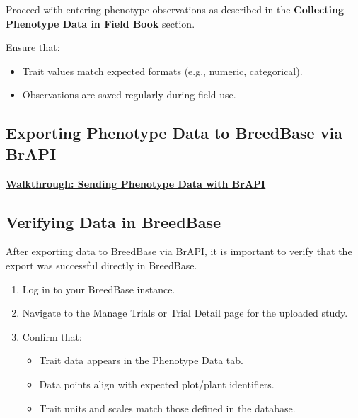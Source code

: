 \documentclass[
  12pt,
]{book}
\providecommand{\tightlist}{%
  \setlength{\itemsep}{0pt}\setlength{\parskip}{0pt}}
\begin{document}
Proceed with entering phenotype observations as described in the \textbf{Collecting Phenotype Data in Field Book} section.

Ensure that:

\begin{itemize}
\tightlist
\item
  Trait values match expected formats (e.g., numeric, categorical).
\item
  Observations are saved regularly during field use.
\end{itemize}

\hypertarget{exporting-phenotype-data-to-breedbase-via-brapi}{%
\subsection{Exporting Phenotype Data to BreedBase via BrAPI}\label{exporting-phenotype-data-to-breedbase-via-brapi}}

\href{https://scribehow.com/shared/Exporting_Data_with_BrAPI__PaWGH98ESQWGrXIZk5lJTQ}{\textbf{Walkthrough: Sending Phenotype Data with BrAPI}}

\hypertarget{verifying-data-in-breedbase}{%
\subsection{Verifying Data in BreedBase}\label{verifying-data-in-breedbase}}

After exporting data to BreedBase via BrAPI, it is important to verify that the export was successful directly in BreedBase.

\begin{enumerate}
\def\labelenumi{\arabic{enumi}.}
\tightlist
\item
  Log in to your BreedBase instance.
\item
  Navigate to the Manage Trials or Trial Detail page for the uploaded study.
\item
  Confirm that:

  \begin{itemize}
  \tightlist
  \item
    Trait data appears in the Phenotype Data tab.
  \item
    Data points align with expected plot/plant identifiers.
  \item
    Trait units and scales match those defined in the database.
  \end{itemize}
\end{enumerate}
\end{document}
